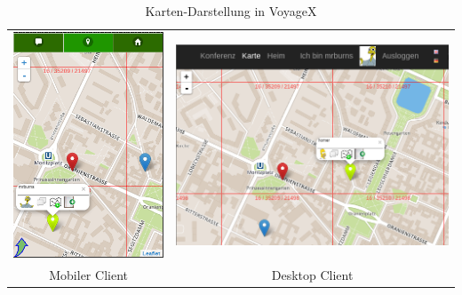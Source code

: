 \begin{table}[H]
  \begin{adjustwidth}{-0.7cm}{0.7cm}
  \begin{tabulary}{\columnwidth}{ c c }
	\includegraphics[scale=0.6]{bilder/screenshots/map_mobile.png} & \includegraphics[scale=0.62]{bilder/screenshots/map_desktop.png} \\
	Mobiler Client & Desktop Client \\
  \end{tabulary}
  \end{adjustwidth}
  \caption{Karten-Darstellung in VoyageX}
\end{table}



